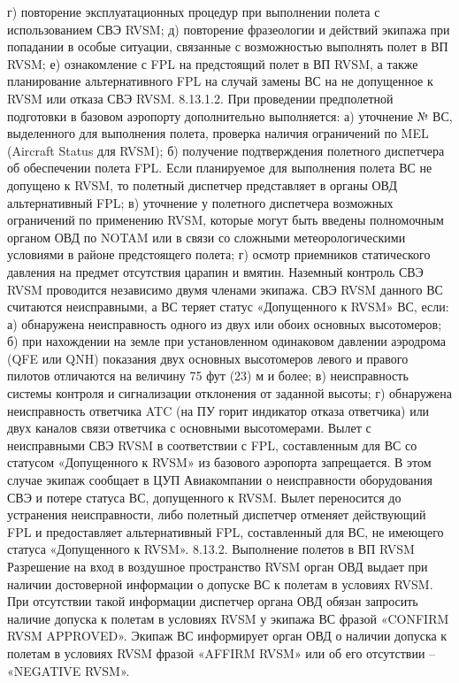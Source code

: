 г)	повторение эксплуатационных процедур при выполнении полета с использованием СВЭ RVSM;
д)	повторение фразеологии и действий экипажа при попадании в особые ситуации, связанные с возможностью выполнять полет в ВП RVSM;
е)	ознакомление с FPL на предстоящий полет в ВП RVSM, а также планирование альтернативного FPL на случай замены ВС на не допущенное к RVSM или отказа СВЭ RVSM.
8.13.1.2. При проведении предполетной подготовки в базовом аэропорту дополнительно выполняется:
а)	уточнение № ВС, выделенного для выполнения полета, проверка наличия ограничений по MEL (Aircraft Status для RVSM);
б)	получение подтверждения полетного диспетчера об обеспечении полета FPL. Если планируемое для выполнения полета ВС не допущено к RVSM, то полетный диспетчер представляет в органы ОВД альтернативный FPL;
в)	уточнение у полетного диспетчера возможных ограничений по применению RVSM, которые могут быть введены полномочным органом ОВД по NOTAM или в связи со сложными метеорологическими условиями в районе предстоящего полета;
г)	осмотр приемников статического давления на предмет отсутствия царапин и вмятин.
Наземный контроль СВЭ RVSM проводится независимо двумя членами экипажа.
СВЭ RVSM данного ВС считаются неисправными, а ВС теряет статус «Допущенного к RVSM» ВС, если:
а)	обнаружена неисправность одного из двух или обоих основных высотомеров;
б)	при нахождении на земле при установленном одинаковом давлении аэродрома (QFE или QNH) показания двух основных высотомеров левого и правого пилотов отличаются на величину 75 фут (23) м и более;
в)	неисправность системы контроля и сигнализации отклонения от заданной высоты;
г)	обнаружена неисправность ответчика ATC (на ПУ горит индикатор отказа ответчика) или двух каналов связи ответчика с основными высотомерами.
Вылет с неисправными СВЭ RVSM в соответствии с FPL, составленным для ВС со статусом «Допущенного к RVSM» из базового аэропорта запрещается. В этом случае экипаж сообщает в ЦУП Авиакомпании о неисправности оборудования СВЭ и потере статуса ВС, допущенного к RVSM. Вылет переносится до устранения неисправности, либо полетный диспетчер отменяет действующий FPL и предоставляет альтернативный FPL, составленный для ВС, не имеющего статуса «Допущенного к RVSM».
8.13.2.	Выполнение полетов в ВП RVSM
Разрешение на вход в воздушное пространство RVSM орган ОВД выдает при наличии достоверной информации о допуске ВС к полетам в условиях RVSM. При отсутствии такой информации диспетчер органа ОВД обязан запросить наличие допуска к полетам в условиях RVSM у экипажа ВС фразой «CONFIRM RVSM APPROVED». Экипаж ВС информирует орган ОВД о наличии допуска к полетам в условиях RVSM фразой «AFFIRM RVSM» или об его отсутствии – «NEGATIVE RVSM».
